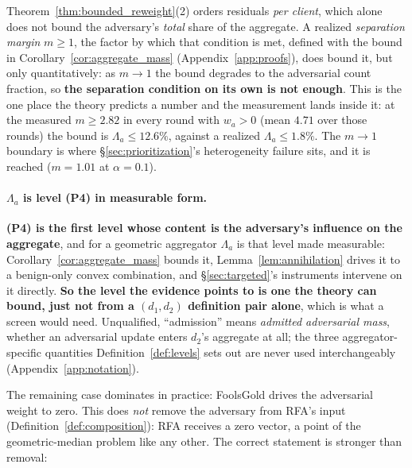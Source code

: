 \documentclass{article}
\begin{document}
Theorem~\ref{thm:bounded_reweight}(2) orders residuals \emph{per client}, which alone does not bound the adversary's \emph{total} share of the aggregate. A realized \emph{separation margin} $m \geq 1$, the factor by which that condition is met, defined with the bound in Corollary~\ref{cor:aggregate_mass} (Appendix~\ref{app:proofs}), does bound it, but only quantitatively: as $m \to 1$ the bound degrades to the adversarial count fraction, so \textbf{the separation condition on its own is not enough}. This is the one place the theory predicts a number and the measurement lands inside it: at the measured $m \geq 2.82$ in every round with $w_a > 0$ (mean $4.71$ over those rounds) the bound is $\Lambda_a \leq 12.6\%$, against a realized $\Lambda_a \leq 1.8\%$. The $m \to 1$ boundary is where \S\ref{sec:prioritization}'s heterogeneity failure sits, and it is reached ($m{=}1.01$ at $\alpha{=}0.1$).

\paragraph{$\Lambda_a$ is level (P4) in measurable form.} \textbf{(P4) is the first level whose content is the adversary's influence on the aggregate}, and for a geometric aggregator $\Lambda_a$ is that level made measurable: Corollary~\ref{cor:aggregate_mass} bounds it, Lemma~\ref{lem:annihilation} drives it to a benign-only convex combination, and \S\ref{sec:targeted}'s instruments intervene on it directly. \textbf{So the level the evidence points to is one the theory can bound, just not from a $(d_1,d_2)$ definition pair alone}, which is what a screen would need. Unqualified, ``admission'' means \emph{admitted adversarial mass}, whether an adversarial update enters $d_2$'s aggregate at all; the three aggregator-specific quantities Definition~\ref{def:levels} sets out are never used interchangeably (Appendix~\ref{app:notation}).

The remaining case dominates in practice: FoolsGold drives the adversarial weight to zero. This does \emph{not} remove the adversary from RFA's input (Definition~\ref{def:composition}): RFA receives a zero vector, a point of the geometric-median problem like any other. The correct statement is stronger than removal:
\end{document}
